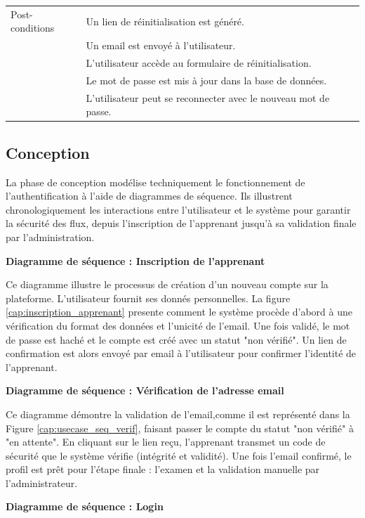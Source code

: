 {\begin{longtable}{|l|p{12cm}|}
Post-conditions &
Un lien de réinitialisation est généré. \\
& Un email est envoyé à l'utilisateur. \\
& L'utilisateur accède au formulaire de réinitialisation. \\
& Le mot de passe est mis à jour dans la base de données. \\
& L'utilisateur peut se reconnecter avec le nouveau mot de passe. \\
\hline
\end{longtable}
}

\subsection{Conception}
La phase de conception modélise techniquement le fonctionnement de l'authentification à l'aide de diagrammes de séquence. Ils illustrent chronologiquement les interactions entre l'utilisateur et le système pour garantir la sécurité des flux, depuis l'inscription de l'apprenant jusqu'à sa validation finale par l'administration.
\vspace{0.3cm}

\noindent\textbf{Diagramme de séquence : Inscription de l'apprenant}

\noindent Ce diagramme illustre le processus de création d'un nouveau compte sur la plateforme. L'utilisateur fournit ses donnés personnelles. La figure \ref{cap:inscription_apprenant} presente comment le système procède d'abord à une vérification du format des données et l'unicité de l'email. Une fois validé, le mot de passe est haché et le compte est créé avec un statut "non vérifié". Un lien de confirmation est alors envoyé par email à l'utilisateur pour confirmer l'identité de l'apprenant.

\vspace{0.3cm}
\noindent \textbf{Diagramme de séquence : Vérification de l'adresse email}

\noindent Ce diagramme démontre la validation de l'email,comme il est représenté dans la Figure \ref{cap:usecase_seq_verif}, faisant passer le compte du statut "non vérifié" à "en attente". En cliquant sur le lien reçu, l'apprenant transmet un code de sécurité que le système vérifie (intégrité et validité). Une fois l'email confirmé, le profil est prêt pour l'étape finale : l'examen et la validation manuelle par l'administrateur.

\vspace{0.3cm}
\noindent\textbf{Diagramme de séquence : Login}

